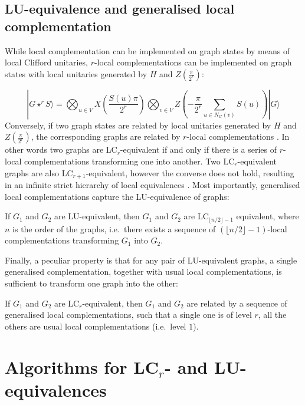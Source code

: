 \documentclass[a4paper,UKenglish,cleveref,autoref,thm-restate]{arxiv}
\newcommand{\ket}[1]{  |{#1} \rangle} \newcommand{\bra}[1]{ \left \langle#1\right | }
\begin{document}
\subsection{LU-equivalence and generalised local complementation}
 
While local complementation can be implemented on graph states by means of local Clifford unitaries, $r$-local complementations can be implemented on graph states with local unitaries generated by $H$ and $Z\left(\frac \pi {2^r}\right)$:

$$\ket{G\star^r S} = \bigotimes_{u\in V}X\left(\frac {S(u)\pi}{2^r}\right)\bigotimes_{v\in V}Z\left(-\frac {\pi}{2^r}\sum_{u \in N_G(v)}S(u)\right)\ket{G}$$
Conversely, if two graph states are related by local unitaries generated by $H$ and $Z\left(\frac \pi {2^r}\right)$, the corresponding graphs are related by $r$-local complementations \cite{claudet2024local}. In other words two graphs are LC$_r$-equivalent if and only if there is a series of $r$-local complementations transforming one into another. Two LC$_r$-equivalent graphs are also LC$_{r+1}$-equivalent, however the converse does not hold, resulting in an infinite strict hierarchy of local equivalences \cite{claudet2024local}. 
Most importantly, generalised local complementations capture the LU-equivalence of graphs:

\begin{theorem}{\bf \cite{claudet2024local}}\label{thm:LU_imply_LCr}
    If $G_1$ and $G_2$ are LU-equivalent, then $G_1$ and $G_2$ are LC$_{\lfloor n/2 \rfloor-1}$ equivalent, where $n$ is the order of the graphs, i.e.~there exists a sequence of $({\lfloor n/2 \rfloor-1})$-local complementations transforming $G_1$ into $G_2$.
\end{theorem}

Finally, a peculiar property is that for any pair of LU-equivalent graphs, a single generalised complementation, together with usual local complementations, is sufficient to transform one graph into the other:

\begin{proposition}{\bf \cite{claudet2024local}} \label{prop:LCr_lc}
 If $G_1$ and $G_2$ are LC$_r$-equivalent, then $G_1$ and $G_2$ are related by a sequence of generalised local complementations, such that a single one is of level $r$, all the others are usual local complementations (i.e.~level $1$).

\end{proposition}


\section{Algorithms for LC$_r$- and LU-equivalences}
\end{document}
